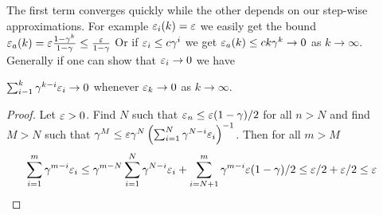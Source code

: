 The first term converges quickly while the other depends on our
step-wise approximations. For example
$\varepsilon_i(k) = \varepsilon$ we easily get the bound
$ \varepsilon_a(k) = \varepsilon \frac{1-\gamma^k}{1-\gamma} \leq \frac{\varepsilon}{1-\gamma} $
Or if $\varepsilon_i \leq c\gamma^i$ we get $\varepsilon_a(k) \leq ck \gamma^k \to 0$ as
$k \to \infty$.
Generally if one can show that $\varepsilon_i \to 0$ we have
\begin{prop} $ \sum_{i-1}^k \gamma^{k-i} \varepsilon_i \to 0 $
  whenever $\varepsilon_k \to 0$ as $k \to \infty$.
\end{prop}
\begin{proof}
  Let $\varepsilon > 0$. Find $N$ such that $\varepsilon_n \leq \varepsilon (1-\gamma)/2$ 
  for all $n>N$ and find $M>N$ such that
  $\gamma^M \leq
  \varepsilon \gamma^N \left( \sum_{i=1}^N \gamma^{N-i} \varepsilon_i \right)^{-1}$.
  Then for all $m>M$
  \begin{align*}
    \sum_{i=1}^m \gamma^{m-i} \varepsilon_i
    &\leq \gamma^{m-N} \sum_{i=1}^N \gamma^{N-i} \varepsilon_i
    + \sum_{i=N+1}^m \gamma^{m-i} \varepsilon (1-\gamma)/2
    \leq \varepsilon/2 + \varepsilon/2 \leq \varepsilon
  \end{align*}
\end{proof}


